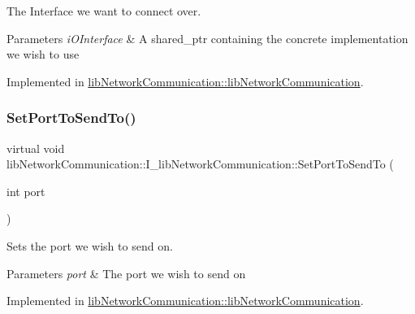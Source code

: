 The Interface we want to connect over. 


\begin{DoxyParams}{Parameters}
{\em i\+O\+Interface} & A shared\+\_\+ptr containing the concrete implementation we wish to use \\
\hline
\end{DoxyParams}


Implemented in \mbox{\hyperlink{classlibNetworkCommunication_1_1libNetworkCommunication_a842d3bfc24ffe5175431f8aad5905266}{lib\+Network\+Communication\+::lib\+Network\+Communication}}.

\mbox{\label{classlibNetworkCommunication_1_1I__libNetworkCommunication_a76dc179dc445ce063ad0ce969a0409c6}} 
\subsubsection{\texorpdfstring{SetPortToSendTo()}{SetPortToSendTo()}}
{\footnotesize\ttfamily virtual void lib\+Network\+Communication\+::\+I\+\_\+lib\+Network\+Communication\+::\+Set\+Port\+To\+Send\+To (\begin{DoxyParamCaption}\item[{int}]{port }\end{DoxyParamCaption})\hspace{0.3cm}{\ttfamily [pure virtual]}}



Sets the port we wish to send on. 


\begin{DoxyParams}{Parameters}
{\em port} & The port we wish to send on \\
\hline
\end{DoxyParams}


Implemented in \mbox{\hyperlink{classlibNetworkCommunication_1_1libNetworkCommunication_a9521f7bfbb8365956239846806e745b6}{lib\+Network\+Communication\+::lib\+Network\+Communication}}.

\mbox{\label{classlibNetworkCommunication_1_1I__libNetworkCommunication_a81430f6597c0831acbd1427fafd02f56}} 
